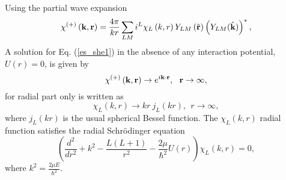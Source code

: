 \documentclass[
12pt, %
oneside, %
english, %
doublespacing, %
doublespacing, %
toctotoc, %
parskip, %
headsepline, %
]{MastersDoctoralThesis} %
\begin{document}
Using the partial wave expansion 
\begin{equation}
\chi^{(+)} \left( {\bf k}, {\bf r} \right) = 
\frac{4 \pi}{kr} \sum_{LM} i^{L} \chi_L \left( k,r \right) 
Y_{LM}\left( \hat{{\bf r}}\right) \left( Y_{LM}( \hat{{\bf k}})\right)^{*},
\end{equation}
A solution for Eq. (\ref{es_she1}) in the absence of any interaction potential, $U \left( r \right) = 0$, is given by 
\begin{equation}
\chi^{(+)} \left( {\bf k}, {\bf r} \right) \rightarrow
e^{i {\bf k} \cdot {\bf r}}, ~~ {\bf r} \rightarrow \infty, 
\end{equation}
for radial part only is written as
\begin{equation}
\chi_L \left( k,r \right)  \rightarrow kr~j_L \left(kr \right),
~~ r \rightarrow \infty,
\end{equation}
where $j_L \left(kr \right)$ is the usual spherical Bessel function. The $\chi_L \left( k,r \right)$ radial function satisfies the radial Schr\"{o}dinger equation
\begin{equation}
\left( \frac{d^2}{d r^2} + k^2 - \frac{L(L+1)}{r^2} - \frac{2 \mu}{\hbar^2} U \left( r \right)\right) \chi_L \left( k,r \right) =0,
\label{es_she_radial}
\end{equation}
where $k^2 = \frac{2\mu E}{\hbar^2}$.
\end{document}
